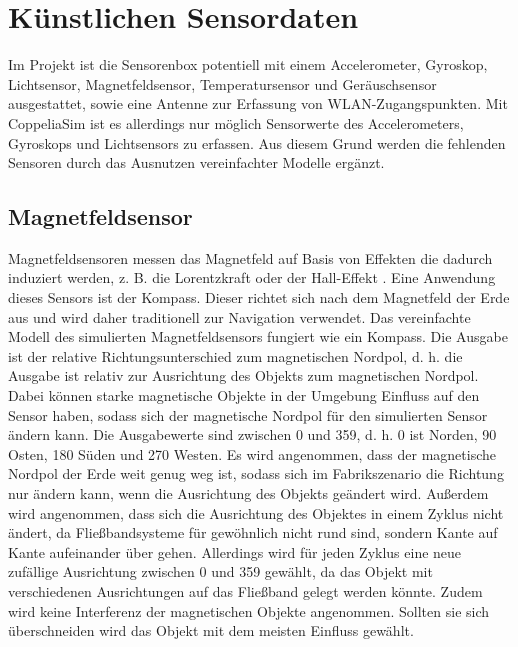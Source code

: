 \section{Künstlichen Sensordaten}
Im Projekt ist die Sensorenbox potentiell mit einem Accelerometer, Gyroskop, Lichtsensor, Magnetfeldsensor,
Temperatursensor und Geräuschsensor ausgestattet, sowie eine Antenne zur Erfassung von WLAN-Zugangspunkten.
Mit CoppeliaSim ist es allerdings nur möglich Sensorwerte des Accelerometers, Gyroskops und Lichtsensors zu erfassen.
Aus diesem Grund werden die fehlenden Sensoren durch das Ausnutzen vereinfachter Modelle ergänzt.

\subsection{Magnetfeldsensor}
Magnetfeldsensoren messen das Magnetfeld auf Basis von Effekten die dadurch induziert werden, z. B. die Lorentzkraft oder der Hall-Effekt \cite{thompsonMEMS}.
Eine Anwendung dieses Sensors ist der Kompass.
Dieser richtet sich nach dem Magnetfeld der Erde aus und wird daher traditionell zur Navigation verwendet.
\newline
\newline
Das vereinfachte Modell des simulierten Magnetfeldsensors fungiert wie ein Kompass.
Die Ausgabe ist der relative Richtungsunterschied zum magnetischen Nordpol,
d. h. die Ausgabe ist relativ zur Ausrichtung des Objekts zum magnetischen Nordpol.
Dabei können starke magnetische Objekte in der Umgebung Einfluss auf den Sensor haben,
sodass sich der magnetische Nordpol für den simulierten Sensor ändern kann.
Die Ausgabewerte sind zwischen 0 und 359, d. h. 0 ist Norden, 90 Osten, 180 Süden und 270 Westen.
\newline
\newline
Es wird angenommen, dass der magnetische Nordpol der Erde weit genug weg ist,
sodass sich im Fabrikszenario die Richtung nur ändern kann, wenn die Ausrichtung des Objekts geändert wird.
Außerdem wird angenommen, dass sich die Ausrichtung des Objektes in einem Zyklus nicht ändert,
da Fließbandsysteme für gewöhnlich nicht rund sind, sondern Kante auf Kante aufeinander über gehen.
Allerdings wird für jeden Zyklus eine neue zufällige Ausrichtung zwischen 0 und 359 gewählt,
da das Objekt mit verschiedenen Ausrichtungen auf das Fließband gelegt werden könnte.
Zudem wird keine Interferenz der magnetischen Objekte angenommen.
Sollten sie sich überschneiden wird das Objekt mit dem meisten Einfluss gewählt.
\newline

